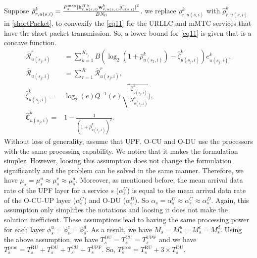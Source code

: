 \documentclass[lettersize,journal]{IEEEtran}
\begin{document}
Suppose $\hat{\rho}_{r,u(s,i)}^{k} =  \frac{P_{s}^{\text{max}}|{\bold{h}_{r,u(s,i)}^{H \: k}} \bold{w}_{r,u(s,i)}^{k} g_{u(s,i)}^r|^2}{BN_0}$.
we replace ${\rho}_{r,u(s,i)}^{k}$ with $\hat{\rho}_{r,u(s,i)}^{k}$ in \eqref{shortPacket}, to convexify the \eqref{eq11} for the URLLC and mMTC services that have the short packet transmission.
So, a lower bound for \eqref{eq11} is given that is a concave function.
\begin{subequations}\label{lb1}
\begin{alignat}{4}
\bar{\mathcal{R}}_{u(s_j,i)}^{r} &= \sum_{k=1}^{K_{s_j}} B (\log_2({1+ \bar{\rho}_{u(s_2,i)}^{k}})- \hat{\zeta}_{u(s_j,i)}^{k}){e}_{u(s_j,i)}^{k},\\
\bar{\mathcal{R}}_{u(s_j,i)} &= \sum_{r=1}^{R}\bar{\mathcal{R}}_{u(s_j,i)}^{r},\\
 \hat{\zeta}_{u(s_j,i)}^{k} =& \log_2({e})Q^{-1}(\epsilon) \sqrt{\frac{\hat{\mathfrak{C}}_{u(s_j,i)}^{k}}{N_{u(s_j,i)}^{k}}}),\\
 \hat{\mathfrak{C}}_{u(s_j,i)}^{k} =& 1 - \frac{1}{(1+\hat{\rho}_{u(s_j,i)}^{k})^2}.
\end{alignat}
\end{subequations}
Without loss of generality, assume that UPF, O-CU and O-DU use the processors with the same processing capability. We notice that it makes the formulation simpler. However, loosing this assumption does not change the formulation significantly and the problem can be solved in the same manner. Therefore, we have $\mu_s = \mu_s^u \approx \mu_s^c \approx \mu_s^d $. Moreover, as mentioned before,
the mean arrival data rate of the UPF layer for a service $s$ ($\alpha_{s}^U$) is equal to the mean arrival data rate of the O-CU-UP layer ($\alpha_{s}^C$) and O-DU ($\alpha_{s}^D$). So $\alpha_{s} =\alpha_{s}^U \approx \alpha_{s}^C \approx \alpha_{s}^D$. Again, this assumption only simplifies the notations and loosing it does not make the solution inefficient.
These assumptions lead to having the same processing power for each layer $\phi_s^u = \phi_s^c =\phi_s^d $.
As a result, we have $M_s = M_s^u = M_s^c = M_s^d $.
Using the above assumption, we have $T^{\text{DU}}_{s} = T^{\text{CU}}_{s} = T^{\text{UPF}}_{s}$ and we have
$T^{\text{proc}}_{s} =  T^{\text{RU}}_{s} + T^{\text{DU}}_{s} + T^{\text{CU}}_{s} + T^{\text{UPF}}_{s}$. So,
$T^{\text{proc}}_{s}=  T^{\text{RU}}_{s} + 3\times T^{\text{DU}}_{s}.$
\end{document}
